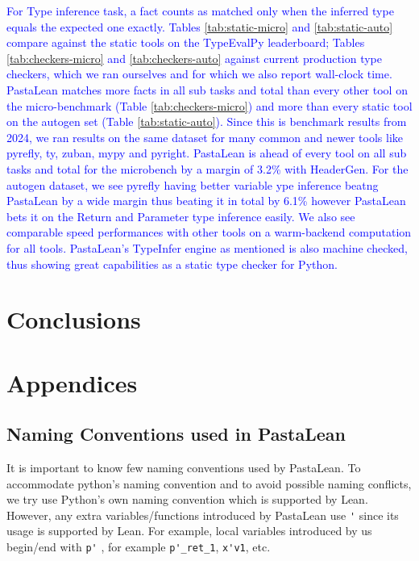 \documentclass{article}
\newcommand{\code}{\lstinline}
\newcommand{\suggest}[1]{\textcolor{blue}{#1}}
\begin{document}
\suggest{
For Type inference task, a fact counts as matched only when the inferred type equals the expected one exactly. Tables \ref{tab:static-micro} and \ref{tab:static-auto} compare against the static tools on the TypeEvalPy leaderboard; Tables \ref{tab:checkers-micro} and \ref{tab:checkers-auto} against current production type checkers, which we ran ourselves and for which we also report wall-clock time. PastaLean matches more facts in all sub tasks and total than every other tool on the micro-benchmark (Table \ref{tab:checkers-micro}) and more than every static tool on the autogen set (Table \ref{tab:static-auto}). Since this is benchmark results from 2024, we ran results on the same dataset for many common and newer tools like pyrefly, ty, zuban, mypy and pyright. PastaLean is ahead of every tool on all sub tasks and total for the microbench by a margin of 3.2\% with HeaderGen. For the autogen dataset, we see pyrefly having better variable ype inference beatng PastaLean by a wide margin thus beating it in total by 6.1\% however PastaLean bets it on the Return and Parameter type inference easily. We also see comparable speed performances with other tools on a warm-backend computation for all tools. PastaLean's TypeInfer engine as mentioned is also machine checked, thus showing great capabilities as a static type checker for Python.}


\FloatBarrier


\section{Conclusions}

\small




\newpage

\appendix

\section{Appendices}

\subsection{Naming Conventions used in PastaLean}\label{naming-convention}

It is important to know few naming conventions used by PastaLean. To accommodate python's naming convention and to avoid possible naming conflicts, we try use Python's own naming convention which is supported by Lean. However, any extra variables/functions introduced by PastaLean use \code{'} since its usage is supported by Lean. For example, local variables introduced by us begin/end with \code{p'} , for example \code{p'_ret_1}, \code{x'v1}, etc.
\end{document}
